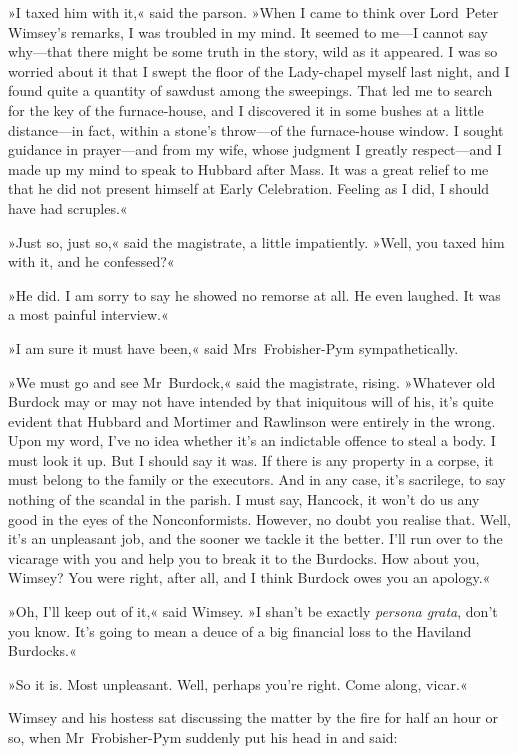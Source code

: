 »I taxed him with it,« said the parson. »When I came to think over Lord~Peter Wimsey's remarks, I was troubled in my mind. It seemed to me—I cannot say why—that there might be some truth in the story, wild as it appeared. I was so worried about it that I swept the floor of the Lady-chapel myself last night, and I found quite a quantity of sawdust among the sweepings. That led me to search for the key of the furnace-house, and I discovered it in some bushes at a little distance—in fact, within a stone's throw—of the furnace-house window. I sought guidance in prayer—and from my wife, whose judgment I greatly respect—and I made up my mind to speak to Hubbard after Mass. It was a great relief to me that he did not present himself at Early Celebration. Feeling as I did, I should have had scruples.«

»Just so, just so,« said the magistrate, a little impatiently. »Well, you taxed him with it, and he confessed?«

»He did. I am sorry to say he showed no remorse at all. He even laughed. It was a most painful interview.«

»I am sure it must have been,« said Mrs~Frobisher-Pym sympathetically.

»We must go and see Mr~Burdock,« said the magistrate, rising. »Whatever old Burdock may or may not have intended by that iniquitous will of his, it's quite evident that Hubbard and Mortimer and Rawlinson were entirely in the wrong. Upon my word, I've no idea whether it's an indictable offence to steal a body. I must look it up. But I should say it was. If there is any property in a corpse, it must belong to the family or the executors. And in any case, it's sacrilege, to say nothing of the scandal in the parish. I must say, Hancock, it won't do us any good in the eyes of the Nonconformists. However, no doubt you realise that. Well, it's an unpleasant job, and the sooner we tackle it the better. I'll run over to the vicarage with you and help you to break it to the Burdocks. How about you, Wimsey? You were right, after all, and I think Burdock owes you an apology.«

»Oh, I'll keep out of it,« said Wimsey. »I shan't be exactly \textit{persona grata}, don't you know. It's going to mean a deuce of a big financial loss to the Haviland Burdocks.«

»So it is. Most unpleasant. Well, perhaps you're right. Come along, vicar.«

Wimsey and his hostess sat discussing the matter by the fire for half an hour or so, when Mr~Frobisher-Pym suddenly put his head in and said:

